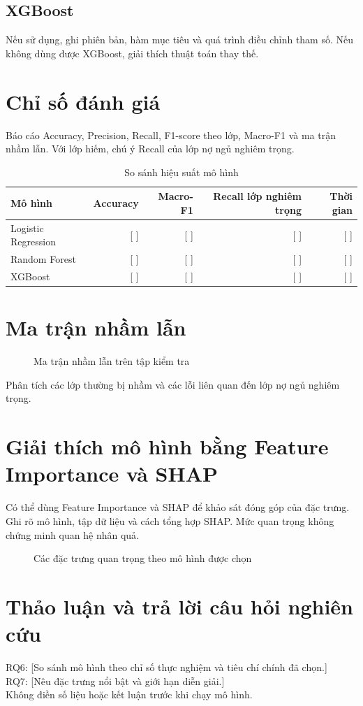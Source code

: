 \subsection{XGBoost}
Nếu sử dụng, ghi phiên bản, hàm mục tiêu và quá trình điều chỉnh tham số. Nếu không dùng được XGBoost, giải thích thuật toán thay thế.
\section{Chỉ số đánh giá}
Báo cáo Accuracy, Precision, Recall, F1-score theo lớp, Macro-F1 và ma trận nhầm lẫn. Với lớp hiếm, chú ý Recall của lớp nợ ngủ nghiêm trọng.
\begin{table}[H]\centering
\caption{So sánh hiệu suất mô hình}
\begin{tabularx}{\textwidth}{Xrrrr}\toprule
Mô hình & Accuracy & Macro-F1 & Recall lớp nghiêm trọng & Thời gian\\\midrule
Logistic Regression & [ ] & [ ] & [ ] & [ ]\\
Random Forest & [ ] & [ ] & [ ] & [ ]\\
XGBoost & [ ] & [ ] & [ ] & [ ]\\\bottomrule
\end{tabularx}\end{table}
\section{Ma trận nhầm lẫn}
\begin{figure}[H]\centering
{}
\caption{Ma trận nhầm lẫn trên tập kiểm tra}\label{fig:confusion}
\end{figure}
Phân tích các lớp thường bị nhầm và các lỗi liên quan đến lớp nợ ngủ nghiêm trọng.
\section{Giải thích mô hình bằng Feature Importance và SHAP}
Có thể dùng Feature Importance và SHAP để khảo sát đóng góp của đặc trưng. Ghi rõ mô hình, tập dữ liệu và cách tổng hợp SHAP. Mức quan trọng không chứng minh quan hệ nhân quả.
\begin{figure}[H]\centering
{}
\caption{Các đặc trưng quan trọng theo mô hình được chọn}\label{fig:shap}
\end{figure}
\section{Thảo luận và trả lời câu hỏi nghiên cứu}
RQ6: [So sánh mô hình theo chỉ số thực nghiệm và tiêu chí chính đã chọn.]\\
RQ7: [Nêu đặc trưng nổi bật và giới hạn diễn giải.]\\
Không điền số liệu hoặc kết luận trước khi chạy mô hình.
